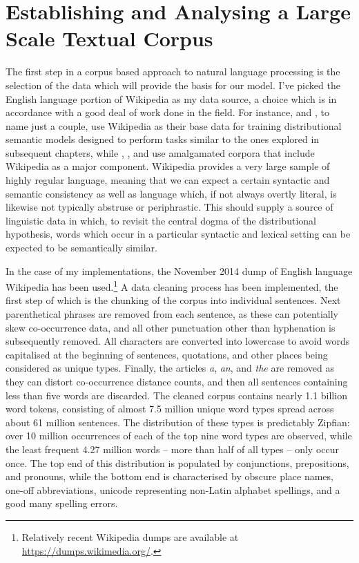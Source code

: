 \section{Establishing and Analysing a Large Scale Textual Corpus}
The first step in a corpus based approach to natural language processing is the selection of the data which will provide the basis for our model.  I've picked the English language portion of Wikipedia as my data source, a choice which is in accordance with a good deal of work done in the field.  For instance, \cite{GabrilovichEA2007} and \cite{CollobertEA2008}, to name just a couple, use Wikipedia as their base data for training distributional semantic models designed to perform tasks similar to the ones explored in subsequent chapters, while \cite{BaroniEA2014}, \cite{PenningtonEA2014}, and \cite{GutierrezEA2016} use amalgamated corpora that include Wikipedia as a major component.  Wikipedia provides a very large sample of highly regular language, meaning that we can expect a certain syntactic and semantic consistency as well as language which, if not always overtly literal, is likewise not typically abstruse or periphrastic.  This should supply a source of linguistic data in which, to revisit the central dogma of the distributional hypothesis, words which occur in a particular syntactic and lexical setting can be expected to be semantically similar.

In the case of my implementations, the November 2014 dump of English language Wikipedia has been used.\footnote{Relatively recent Wikipedia dumps are available at \url{https://dumps.wikimedia.org/}.}  A data cleaning process has been implemented, the first step of which is the chunking of the corpus into individual sentences.  Next parenthetical phrases are removed from each sentence, as these can potentially skew co-occurrence data, and all other punctuation other than hyphenation is subsequently removed.  All characters are converted into lowercase to avoid words capitalised at the beginning of sentences, quotations, and other places being considered as unique types.  Finally, the articles \emph{a}, \emph{an}, and \emph{the} are removed as they can distort co-occurrence distance counts, and then all sentences containing less than five words are discarded.  The cleaned corpus contains nearly 1.1 billion word tokens, consisting of almost 7.5 million unique word types spread across about 61 million sentences.  The distribution of these types is predictably Zipfian: over 10 million occurrences of each of the top nine word types are observed, while the least frequent 4.27 million words -- more than half of all types -- only occur once.  The top end of this distribution is populated by conjunctions, prepositions, and pronouns, while the bottom end is characterised by obscure place names, one-off abbreviations, unicode representing non-Latin alphabet spellings, and a good many spelling errors.

